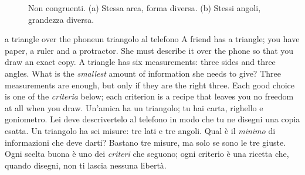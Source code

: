 \begin{figure}[htbp]
\centering
%
      {Non congruenti. (a) Stessa area, forma diversa. (b) Stessi angoli, grandezza diversa.}
\label{fig:notcong}
\end{figure}

\label{sec:criteria}
\begin{think}{a triangle over the phone}{un triangolo al telefono}
A friend has a triangle; you have paper, a ruler and a protractor. She must describe it over the phone so that you draw an exact copy. A triangle has six measurements: three sides and three angles. What is the \emph{smallest} amount of information she needs to give?
\answer Three measurements are enough, but only if they are the right three. Each good choice is one of the \emph{criteria} below; each criterion is a recipe that leaves you no freedom at all when you draw.
\tcblower
Un'amica ha un triangolo; tu hai carta, righello e goniometro. Lei deve descrivertelo al telefono in modo che tu ne disegni una copia esatta. Un triangolo ha sei misure: tre lati e tre angoli. Qual è il \emph{minimo} di informazioni che deve darti?
\answer Bastano tre misure, ma solo se sono le tre giuste. Ogni scelta buona è uno dei \emph{criteri} che seguono; ogni criterio è una ricetta che, quando disegni, non ti lascia nessuna libertà.
\end{think}

